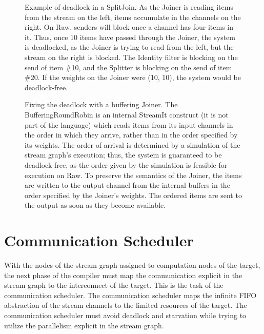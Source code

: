 \begin{figure}
\centering
{}
\parbox{6in}{\caption{\protect\small Example of deadlock in a
SplitJoin.  As the Joiner is reading items from the stream on the
left, items accumulate in the channels on the right.  On Raw, senders
will block once a channel has four items in it.  Thus, once 10 items
have passed through the Joiner, the system is deadlocked, as the
Joiner is trying to read from the left, but the stream on the right is
blocked.  The Identity filter is blocking on the send of item \#10,
and the Splitter is blocking on the send of item \#20.  If the weights
on the Joiner were (10, 10), the system would be deadlock-free.
\protect\label{fig:joiner-dead}}}

\vspace{48pt}

\caption{\protect\small Fixing the deadlock with a buffering Joiner.
The BufferingRoundRobin is an internal StreamIt construct (it is not
part of the language) which reads items from its input channels in the
order in which they arrive, rather than in the order specified by its
weights.  The order of arrival is determined by a simulation of the
stream graph's execution; thus, the system is guaranteed to be
deadlock-free, as the order given by the simulation is feasible for
execution on Raw.  To preserve the semantics of the Joiner, the items
are written to the output channel from the internal buffers in the
order specified by the Joiner's weights.  The ordered items are sent
to the output as soon as they become available.
\protect\label{fig:joiner-live}}
\end{figure}

\section{Communication Scheduler}
\label{sec:communic}

With the nodes of the stream graph assigned to computation nodes of
the target, the next phase of the compiler must map the communication
explicit in the stream graph to the interconnect of the target.  This
is the task of the communication scheduler.  The communication
scheduler maps the infinite FIFO abstraction of the stream channels to
the limited resources of the target.  The communication scheduler must
avoid deadlock and starvation while trying to utilize the parallelism
explicit in the stream graph.

